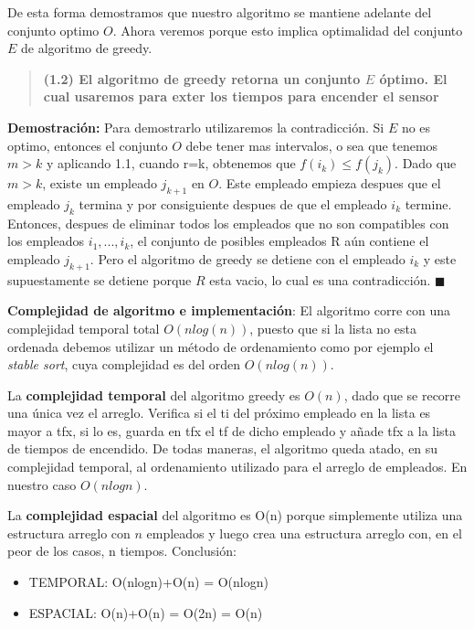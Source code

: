 \documentclass{article}
\begin{document}
De esta forma demostramos que nuestro algoritmo se mantiene adelante del conjunto optimo \(O\). Ahora veremos porque esto implica optimalidad del conjunto \(E\) de algoritmo de greedy.

\begin{quote}
    \textbf{(1.2) El algoritmo de greedy retorna un conjunto \(E\) óptimo. El cual usaremos para exter los tiempos para encender el sensor}
\end{quote}

\textbf{Demostración:} Para demostrarlo utilizaremos la contradicción. Si \(E\) no es optimo, entonces el conjunto \(O\) debe tener mas intervalos, o sea que tenemos \(m>k\) y aplicando 1.1, cuando r=k, 
obtenemos que \(f(i_k) \leq f(j_k)\). Dado que \(m>k\), existe un empleado \(j_{k+1}\) en \(O\). Este empleado empieza despues que el empleado \(j_k\) termina y por consiguiente despues de que el empleado \(i_k\) termine.
Entonces, despues de eliminar todos los empleados que no son compatibles con los empleados \(i_1,...,i_k\), el conjunto de posibles empleados R aún contiene el empleado \(j_{k+1}\). 
Pero el algoritmo de greedy se detiene con el empleado \(i_k\) y este supuestamente se detiene porque \(R\) esta vacio, lo cual es una contradicción. \(\blacksquare\)

\textbf{Complejidad de algoritmo e implementación}: 
El algoritmo corre con una complejidad temporal total \(O(nlog(n))\), puesto que si la lista no esta ordenada 
debemos utilizar un método de ordenamiento como por ejemplo el \textit{stable sort}, cuya complejidad es del 
orden \(O(n log(n))\). 

La \textbf{complejidad temporal} del algoritmo greedy es \(O(n)\), dado que se recorre una única vez el arreglo. 
Verifica si el ti del próximo empleado en la lista es mayor a tfx, si lo es, guarda en tfx el 
tf de dicho empleado y añade tfx a la lista de tiempos de encendido. De todas maneras, 
el algoritmo queda atado, en su complejidad temporal, al ordenamiento utilizado para el 
arreglo de empleados. En nuestro caso \(O(nlogn)\).

La \textbf{complejidad espacial} del algoritmo es O(n) porque simplemente utiliza una estructura arreglo 
con \(n\) empleados y luego crea una estructura arreglo con, en el peor de los casos, n tiempos. Conclusión:

\begin{itemize}
    \item TEMPORAL: O(nlogn)+O(n) = O(nlogn)
    \item ESPACIAL: O(n)+O(n) = O(2n) = O(n)
\end{itemize}
\end{document}
